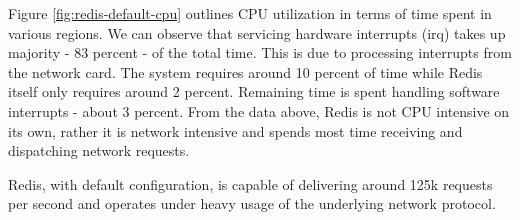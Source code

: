 Figure \ref{fig:redis-default-cpu} outlines CPU utilization in terms of time spent in various regions. We can observe that servicing hardware interrupts (irq) takes up majority - 83 percent - of the total time. This is due to processing interrupts from the network card. The system requires around 10 percent of time while Redis itself only requires around 2 percent. Remaining time is spent handling software interrupts - about 3 percent. From the data above, Redis is not CPU intensive on its own, rather it is network intensive and spends most time receiving and dispatching network requests.


Redis, with default configuration, is capable of delivering around 125k requests per second and operates under heavy usage of the underlying network protocol.


